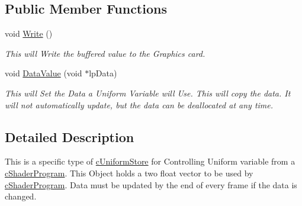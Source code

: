 \subsection*{Public Member Functions}
\begin{DoxyCompactItemize}
\item 
\hypertarget{classc_uniform_vector2_af1d67d0c6c4a5cd1ba5d3d69a935d0b8}{
void \hyperlink{classc_uniform_vector2_af1d67d0c6c4a5cd1ba5d3d69a935d0b8}{Write} ()}
\label{classc_uniform_vector2_af1d67d0c6c4a5cd1ba5d3d69a935d0b8}

\begin{DoxyCompactList}\small\item\em This will Write the buffered value to the Graphics card. \end{DoxyCompactList}\item 
\hypertarget{classc_uniform_vector2_a41608836ad41d632b04bb22f9f535c98}{
void \hyperlink{classc_uniform_vector2_a41608836ad41d632b04bb22f9f535c98}{DataValue} (void $\ast$lpData)}
\label{classc_uniform_vector2_a41608836ad41d632b04bb22f9f535c98}

\begin{DoxyCompactList}\small\item\em This will Set the Data a Uniform Variable will Use. This will copy the data. It will not automatically update, but the data can be deallocated at any time. \end{DoxyCompactList}\end{DoxyCompactItemize}


\subsection{Detailed Description}
This is a specific type of \hyperlink{classc_uniform_store}{cUniformStore} for Controlling Uniform variable from a \hyperlink{classc_shader_program}{cShaderProgram}. This Object holds a two float vector to be used by \hyperlink{classc_shader_program}{cShaderProgram}. Data must be updated by the end of every frame if the data is changed. 